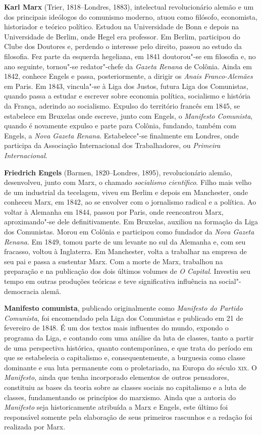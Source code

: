 \textbf{Karl Marx} (Trier, 1818--Londres, 1883), intelectual revolucionário
alemão e um dos principais ideólogos do comunismo moderno, atuou como
filósofo, economista, historiador e teórico político. Estudou na Universidade de
Bonn e depois na Universidade de Berlim, onde Hegel era professor. Em Berlim,
participou do Clube dos Doutores e, perdendo o interesse pelo direito, passou ao
estudo da filosofia. Fez parte da esquerda hegeliana, em 1841 doutorou"-se em
filosofia e, no ano seguinte, tornou"-se redator"-chefe da \textit{Gazeta Renana}
de Colônia. Ainda em 1842, conhece Engels e passa, posteriormente, a dirigir os
\textit{Anais Franco-Alemães} em Paris. Em 1843, vincula"-se à Liga dos Justos,
futura Liga dos Comunistas, quando passa a estudar e escrever sobre economia política,
socialismo e história da França, aderindo ao socialismo. Expulso do território francês em
1845, se estabelece em Bruxelas onde escreve, junto com Engels, o
\textit{Manifesto Comunista}, quando é novamente expulso e parte para Colônia, fundando,
também com Engels, a \textit{Nova Gazeta Renana}. 
Estabelece"-se finalmente em Londres, onde participa da Associação Internacional dos
Trabalhadores, ou \textit{Primeira Internacional}. 

\textbf{Friedrich Engels} (Barmen, 1820--Londres, 1895), revolucionário alemão,
desenvolveu, junto com Marx, o chamado \textit{socialismo científico}. Filho mais velho
de um industrial da tecelagem, viveu em Berlim e depois em Manchester, onde
conheceu Marx, em 1842, ao se envolver com o jornalismo radical e a política.
Ao voltar à Alemanha em 1844, passou por Paris, onde reencontrou Marx,
aproximando"-se dele definitivamente. Em Bruxelas, auxiliou na formação da Liga
dos Comunistas. Morou em Colônia e participou como fundador da \textit{Nova
Gazeta Renana}. Em 1849, tomou parte de um levante no sul da Alemanha e, com seu
fracasso, voltou à Inglaterra. Em Manchester, volta a trabalhar na empresa de
seu pai e passa a sustentar Marx. 
Com a morte de Marx, trabalhou na preparação e na publicação dos dois últimos
volumes de \textit{O Capital}. Investiu seu tempo em outras produções teóricas e
teve significativa influência na social"-democracia alemã.

\pagebreak
\thispagestyle{empty}

\textbf{Manifesto comunista},
publicado originalmente como \textit{Manifesto do Partido Comunista}, foi encomendado
pela Liga dos Comunistas e publicado em 21 de fevereiro de 1848. É um dos textos
mais influentes do mundo, expondo o programa da Liga, e contando com uma análise
da luta de classes, tanto a partir de uma perspectiva histórica, quanto
contemporânea, e que trata do período em que se estabelecia o capitalismo e,
consequentemente, a burguesia como classe dominante e sua luta permanente com o
proletariado, na Europa do século \textsc{xix}. O \textit{Manifesto}, ainda que tenha
incorporado elementos de outros pensadores, constituiu as bases da teoria sobre
as classes sociais no capitalismo e a luta de classes, fundamentando os
princípios do marxismo. Ainda que a autoria do \textit{Manifesto} seja
historicamente atribuída a Marx e Engels, este último foi responsável somente
pela elaboração de seus primeiros rascunhos e a redação foi realizada por Marx.
       
